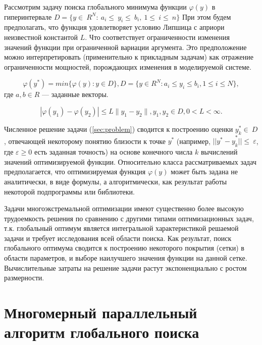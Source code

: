 \documentclass{svproc}
\begin{document}
Рассмотрим задачу поиска глобального минимума функции $\varphi(y)$ в гиперинтервале $D=\{ y\in\ R^N:\ a_i\le\ y_i\le\ b_i,\ 1\le\ i\le\ n \}$ При этом будем предполагать, что функция удовлетворяет условию Липшица с априори неизвестной константой $L$. Что соответствует ограниченности изменения значений функции при ограниченной вариации аргумента. Это предположение можно интерпретировать (применительно к прикладным задачам) как отражение ограниченности мощностей, порождающих изменения в моделируемой системе. 




\begin{equation} \label{sec:problem}   
\varphi(y^*) = min\{\varphi(y):y\in D\}, D = \{y \in R^N : a_i \leq y_i \leq b_i, 1 \leq i \leq N \},
\end{equation}
где $a,b \in R$ --- заданные векторы.


\begin{displaymath}
|\varphi(y_1)-\varphi(y_2)|\leq L\parallel y_1-y_2 \parallel
,y_1,y_2 \in D, 0<L< \infty.
\end{displaymath}




Численное решение задачи (\ref{sec:problem})   сводится к построению оценки $ y_k^\ast\in\ D$ , отвечающей некоторому понятию близости к точке $y^\ast$ (например, ${||y^\ast-y}_k^\ast||\le\ \varepsilon$, где $\varepsilon\geq0$ есть заданная точность) на основе конечного числа $k$ вычислений значений оптимизируемой функции. Относительно класса рассматриваемых задач предполагается, что оптимизируемая функция $\varphi(y)$ может быть задана не аналитически, в виде формулы, а алгоритмически, как результат работы некоторой подпрограммы или библиотеки.

Задачи многоэкстремальной оптимизации имеют существенно более высокую трудоемкость решения по сравнению с другими типами оптимизационных задач, т.к. глобальный оптимум является интегральной характеристикой решаемой задачи и требует исследования всей области поиска. Как результат, поиск глобального оптимума сводится к построению некоторого покрытия (сетки) в области параметров, и выборе наилучшего значения функции на данной сетке. Вычислительные затраты на решение задачи растут экспоненциально с ростом размерности.

\section{Многомерный параллельный алгоритм глобального поиска}
\end{document}
